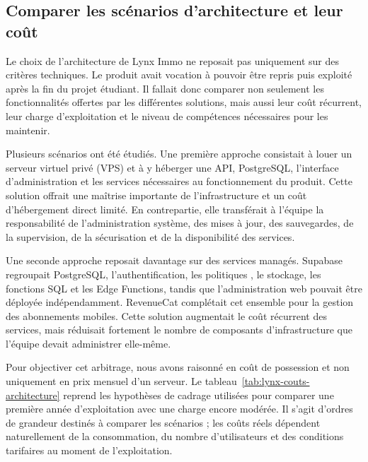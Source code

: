 \subsection{Comparer les scénarios d'architecture et leur coût}

Le choix de l'architecture de Lynx Immo ne reposait pas uniquement sur des critères techniques. Le produit avait vocation à pouvoir être repris puis exploité après la fin du projet étudiant. Il fallait donc comparer non seulement les fonctionnalités offertes par les différentes solutions, mais aussi leur coût récurrent, leur charge d'exploitation et le niveau de compétences nécessaires pour les maintenir.

Plusieurs scénarios ont été étudiés. Une première approche consistait à louer un serveur virtuel privé (VPS) et à y héberger une API, PostgreSQL, l'interface d'administration et les services nécessaires au fonctionnement du produit. Cette solution offrait une maîtrise importante de l'infrastructure et un coût d'hébergement direct limité. En contrepartie, elle transférait à l'équipe la responsabilité de l'administration système, des mises à jour, des sauvegardes, de la supervision, de la sécurisation et de la disponibilité des services.

Une seconde approche reposait davantage sur des services managés. Supabase regroupait PostgreSQL, l'authentification, les politiques , le stockage, les fonctions SQL et les Edge Functions, tandis que l'administration web pouvait être déployée indépendamment. RevenueCat complétait cet ensemble pour la gestion des abonnements mobiles. Cette solution augmentait le coût récurrent des services, mais réduisait fortement le nombre de composants d'infrastructure que l'équipe devait administrer elle-même.

Pour objectiver cet arbitrage, nous avons raisonné en coût de possession et non uniquement en prix mensuel d'un serveur. Le tableau~\ref{tab:lynx-couts-architecture} reprend les hypothèses de cadrage utilisées pour comparer une première année d'exploitation avec une charge encore modérée. Il s'agit d'ordres de grandeur destinés à comparer les scénarios ; les coûts réels dépendent naturellement de la consommation, du nombre d'utilisateurs et des conditions tarifaires au moment de l'exploitation.

